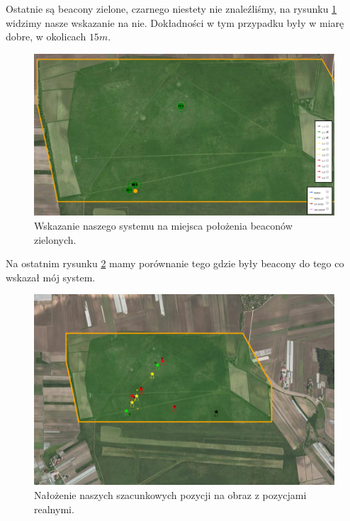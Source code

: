 Ostatnie są beacony zielone, czarnego niestety nie znaleźliśmy, na rysunku \ref{fig:wskazaniezielone} widzimy nasze wskazanie na nie. Dokładności w tym przypadku były w miarę dobre, w okolicach $15 m$.

\begin{figure}[!th]
    \centering
    \includegraphics[width=15cm]{zalaczniki/obrazy/wskazanie_zielone.png}
    \caption{Wskazanie naszego systemu na miejsca położenia beaconów zielonych.}
    \label{fig:wskazaniezielone}
\end{figure}

Na ostatnim rysunku \ref{fig:beaconykonkursowenasze} mamy porównanie tego gdzie były beacony do tego co wskazał mój system.

\begin{figure}[!th]
    \centering
    \includegraphics[width=15cm]{zalaczniki/obrazy/beacony_konkursowe_nasze.png}
    \caption{Nałożenie naszych szacunkowych pozycji na obraz z pozycjami realnymi.}
    \label{fig:beaconykonkursowenasze}
\end{figure}

